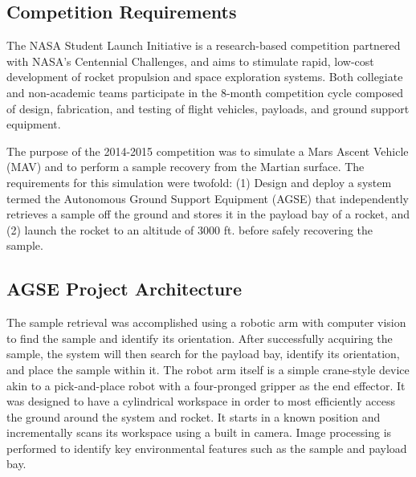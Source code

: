 

\subsection{Competition Requirements}

The NASA Student Launch Initiative \cite{NASA_SL} is a research-based competition partnered with NASA's Centennial Challenges, and aims to stimulate rapid, low-cost development of rocket propulsion and space exploration systems.  Both collegiate and non-academic teams participate in the 8-month competition cycle composed of design, fabrication, and testing of flight vehicles, payloads, and ground support equipment. 

The purpose of the 2014-2015 competition was to simulate a Mars Ascent Vehicle (MAV) and to perform a sample recovery from the Martian surface. The requirements for this simulation were twofold: (1) Design and deploy a system termed the Autonomous Ground Support Equipment (AGSE) that independently retrieves a sample off the ground and stores it in the payload bay of a rocket, and (2) launch the rocket to an altitude of 3000 ft. before safely recovering the sample. 



\subsection{AGSE Project Architecture}

The sample retrieval was accomplished using a robotic arm with computer vision to find the sample and identify its orientation. After successfully acquiring the sample, the system will then search for the payload bay, identify its orientation, and place the sample within it.  The robot arm itself is a simple crane-style device akin to a pick-and-place robot with a four-pronged gripper as the end effector.  It was designed to have a cylindrical workspace in order to most efficiently access the ground around the system and rocket. It starts in a known position and incrementally scans its workspace using a built in camera. Image processing is performed to identify key environmental features such as the sample and payload bay.

